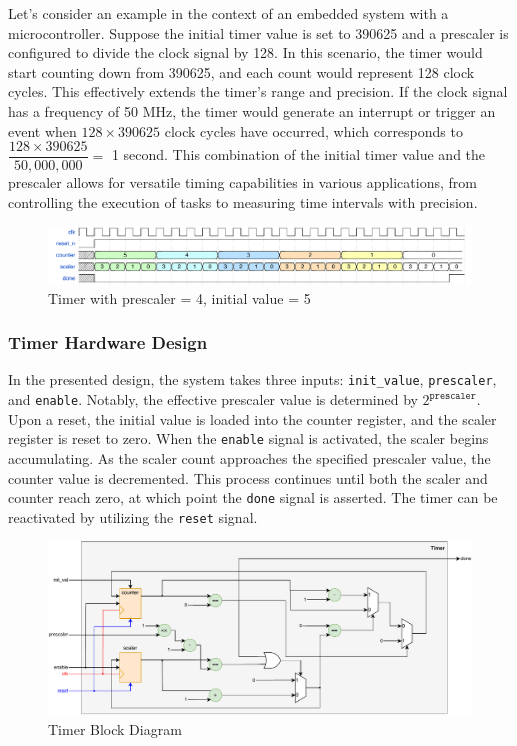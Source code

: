 \documentclass[12pt,a4paper,oneside]{book} %
\begin{document}
Let's consider an example in the context of an embedded system with a microcontroller. Suppose the initial timer value is set to 390625 and a prescaler is configured to divide the clock signal by 128. In this scenario, the timer would start counting down from 390625, and each count would represent 128 clock cycles. This effectively extends the timer's range and precision. If the clock signal has a frequency of 50 MHz, the timer would generate an interrupt or trigger an event when $128\times 390625$ clock cycles have occurred, which corresponds to $\dfrac{128\times 390625}{50,000,000} = $ 1 second. This combination of the initial timer value and the prescaler allows for versatile timing capabilities in various applications, from controlling the execution of tasks to measuring time intervals with precision.

\begin{figure}[H]
    \centering
    \includegraphics[width=\textwidth]{images/timer_wave.pdf}
    \caption{Timer with prescaler = 4, initial value = 5}
\end{figure}

\subsubsection{Timer Hardware Design}
In the presented design, the system takes three inputs: \texttt{init\_value}, \texttt{prescaler}, and \texttt{enable}. Notably, the effective prescaler value is determined by $2^{\texttt{prescaler}}$. Upon a reset, the initial value is loaded into the counter register, and the scaler register is reset to zero. When the \texttt{enable} signal is activated, the scaler begins accumulating. As the scaler count approaches the specified prescaler value, the counter value is decremented. This process continues until both the scaler and counter reach zero, at which point the \texttt{done} signal is asserted. The timer can be reactivated by utilizing the \texttt{reset} signal.

\begin{figure}[H]
    \centering
    \includegraphics[width=.95\textwidth]{images/timer.pdf}
    \caption{Timer Block Diagram}
\end{figure}
\end{document}
